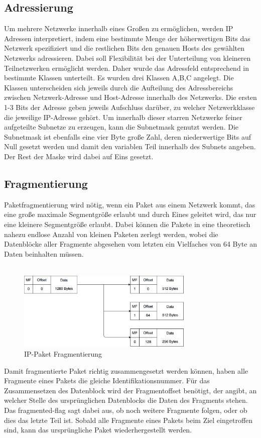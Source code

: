 \subsection{Adressierung}
Um mehrere Netzwerke innerhalb eines Großen zu ermöglichen, werden IP Adressen interpretiert, indem eine bestimmte Menge der höherwertigen Bits das Netzwerk spezifiziert und die restlichen Bits den genauen Hosts des gewählten Netzwerks adressieren. Dabei soll Flexibilität bei der Unterteilung von kleineren Teilnetzwerken ermöglicht werden. Daher wurde das Adressfeld entsprechend in bestimmte Klassen unterteilt. Es wurden drei Klassen A,B,C angelegt. Die Klassen unterscheiden sich jeweils durch die Aufteilung des Adressbereichs zwischen Netzwerk-Adresse und Host-Adresse innerhalb des Netzwerks. Die ersten 1-3 Bits der Adresse geben jeweils Aufschluss darüber, zu welcher Netzwerkklasse die jeweilige IP-Adresse gehört. Um innerhalb dieser starren Netzwerke feiner aufgeteilte Subnetze zu erzeugen, kann die Subnetmask genutzt werden. Die Subnetmask ist ebenfalls eine vier Byte große Zahl, deren niederwertige Bits auf Null gesetzt werden und damit den variablen Teil innerhalb des Subnets angeben. Der Rest der Maske wird dabei auf Eins gesetzt.


\subsection{Fragmentierung}

Paketfragmentierung wird nötig, wenn ein Paket aus einem Netzwerk kommt, das eine große maximale Segmentgröße erlaubt und durch Eines geleitet wird, das nur eine kleinere Segmentgröße erlaubt. Dabei können die Pakete in eine theoretisch nahezu endlose Anzahl von kleinen Paketen zerlegt werden, wobei die Datenblöcke aller Fragmente abgesehen vom letzten ein Vielfaches von 64 Byte an Daten beinhalten müssen.\\\\
\begin{figure}[htp]
	\centering
	\includegraphics[width=0.75\textwidth]{Graphics/IPfragmentation.png}
	\caption{IP-Paket Fragmentierung}
\end{figure}
Damit fragmentierte Paket richtig zusammengesetzt werden können, haben alle Fragmente eines Pakets die gleiche Identifikationsnummer. Für das Zusammensetzen des Datenblock wird der Fragmentoffset benötigt, der angibt, an welcher Stelle des ursprünglichen Datenblocks die Daten des Fragments stehen. Das fragmented-flag sagt dabei aus, ob noch weitere Fragmente folgen, oder ob dies das letzte Teil ist. Sobald alle Fragmente eines Pakets beim Ziel eingetroffen sind, kann das ursprüngliche Paket wiederhergestellt werden. 

